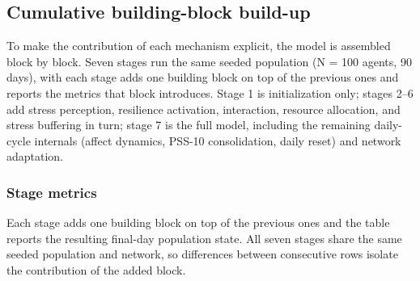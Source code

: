\documentclass[
  letterpaper,
  DIV=11,
  numbers=noendperiod]{scrartcl}
\begin{document}
\subsection{Cumulative building-block
build-up}\label{cumulative-building-block-build-up}

To make the contribution of each mechanism explicit, the model is
assembled block by block. Seven stages run the same seeded population (N
= 100 agents, 90 days), with each stage adds one building block on top
of the previous ones and reports the metrics that block introduces.
Stage 1 is initialization only; stages 2--6 add stress perception,
resilience activation, interaction, resource allocation, and stress
buffering in turn; stage 7 is the full model, including the remaining
daily-cycle internals (affect dynamics, PSS-10 consolidation, daily
reset) and network adaptation.

\subsubsection{Stage metrics}\label{stage-metrics}

Each stage adds one building block on top of the previous ones and the
table reports the resulting final-day population state. All seven stages
share the same seeded population and network, so differences between
consecutive rows isolate the contribution of the added block.
\end{document}
